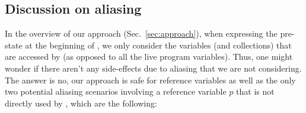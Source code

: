 \documentclass[runningheads,a4paper]{llncs}
\begin{document}


\subsection{Discussion on aliasing} \label{sec:aliasing}
In the overview of our approach (Sec.~\ref{sec:approach}),
when expressing the pre-state at the beginning of ,
we only consider the variables (and collections) that are accessed by
 (as opposed to all the live program variables).
Thus, one might wonder if there aren't any side-effects due to aliasing 
that we are not considering.
The answer is no, our approach is safe for reference variables as well as
the only two potential aliasing scenarios involving a 
reference variable $p$ that is not directly used by ,
which are the following:
\end{document}

